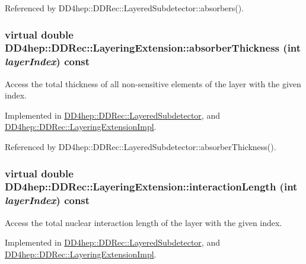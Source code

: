 Referenced by DD4hep::DDRec::LayeredSubdetector::absorbers().\hypertarget{class_d_d4hep_1_1_d_d_rec_1_1_layering_extension_ab4c19a0eccfd5cffc6816fa3b0ec9fb7}{
\subsubsection[{absorberThickness}]{\setlength{\rightskip}{0pt plus 5cm}virtual double DD4hep::DDRec::LayeringExtension::absorberThickness (int {\em layerIndex}) const}}
\label{class_d_d4hep_1_1_d_d_rec_1_1_layering_extension_ab4c19a0eccfd5cffc6816fa3b0ec9fb7}


Access the total thickness of all non-\/sensitive elements of the layer with the given index. 

Implemented in \hyperlink{class_d_d4hep_1_1_d_d_rec_1_1_layered_subdetector_a8faf64a31a2b59b038ad5e76a70f4220}{DD4hep::DDRec::LayeredSubdetector}, and \hyperlink{class_d_d4hep_1_1_d_d_rec_1_1_layering_extension_impl_ad3189cae9f334260aa6fd17b45b1c8eb}{DD4hep::DDRec::LayeringExtensionImpl}.

Referenced by DD4hep::DDRec::LayeredSubdetector::absorberThickness().\hypertarget{class_d_d4hep_1_1_d_d_rec_1_1_layering_extension_aa7959c9c384c0f5ffcd066c5dc01514f}{
\subsubsection[{interactionLength}]{\setlength{\rightskip}{0pt plus 5cm}virtual double DD4hep::DDRec::LayeringExtension::interactionLength (int {\em layerIndex}) const}}
\label{class_d_d4hep_1_1_d_d_rec_1_1_layering_extension_aa7959c9c384c0f5ffcd066c5dc01514f}


Access the total nuclear interaction length of the layer with the given index. 

Implemented in \hyperlink{class_d_d4hep_1_1_d_d_rec_1_1_layered_subdetector_a20c3329b432909abc794c717e141c6e2}{DD4hep::DDRec::LayeredSubdetector}, and \hyperlink{class_d_d4hep_1_1_d_d_rec_1_1_layering_extension_impl_ac49c6a128965c06b302fd0d2dda34de5}{DD4hep::DDRec::LayeringExtensionImpl}.

